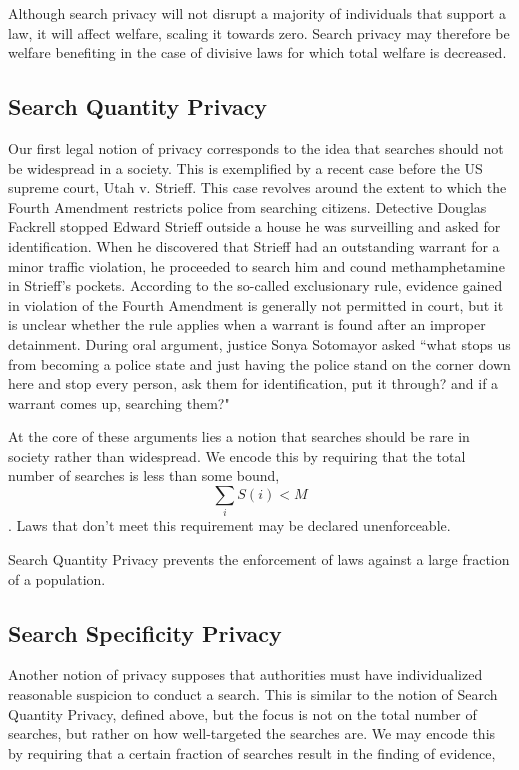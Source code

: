 Although search privacy will not disrupt a majority of individuals that support a law, it will affect welfare, scaling it towards zero.  Search privacy may therefore be welfare benefiting in the case of divisive laws for which total welfare is decreased.

\subsection{Search Quantity Privacy}

Our first legal notion of privacy corresponds to the idea that searches should not be widespread in a society.  This is exemplified by a recent case before the US supreme court, Utah v. Strieff.  This case revolves around the extent to which the Fourth Amendment restricts police from searching citizens.  Detective Douglas Fackrell stopped Edward Strieff outside a house he was surveilling and asked for identification.  When he discovered that Strieff had an outstanding warrant for a minor traffic violation, he proceeded to search him and cound methamphetamine in Strieff's pockets.  According to the so-called exclusionary rule, evidence gained in violation of the Fourth Amendment is generally not permitted in court, but it is unclear whether the rule applies when a warrant is found after an improper detainment.  During oral argument, justice Sonya Sotomayor asked ``what stops us from becoming a police state and just having the police stand on the corner down here and stop every person, ask them for identification, put it through? and if a warrant comes up, searching them?"

At the core of these arguments lies a notion that searches should be rare in society rather than widespread.  We encode this by requiring that the total number of searches is less than some bound, $$\sum_i S(i) < M$$.  Laws that don't meet this requirement may be declared unenforceable.

Search Quantity Privacy prevents the enforcement of laws against a large fraction of a population.


\subsection{Search Specificity Privacy}

Another notion of privacy supposes that authorities must have individualized reasonable suspicion to conduct a search.  This is similar to the notion of Search Quantity Privacy, defined above, but the focus is not on the total number of searches, but rather on how well-targeted the searches are.  We may encode this by requiring that a certain fraction of searches result in the finding of evidence,

